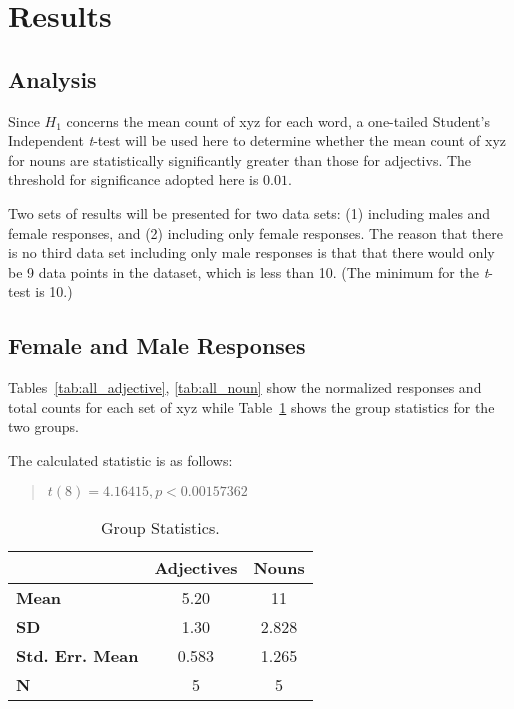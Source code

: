 \section {Results}
\label{results}
\subsection {Analysis} 
Since $H_{1}$ concerns the mean count of xyz for each word, a one-tailed Student's Independent \textit{t}-test will be used here to determine whether the mean count of xyz for nouns are statistically significantly greater than those for adjectivs.  The threshold for significance adopted here is $0.01$.  

Two sets of results will be presented for two data sets: (1) including males and female responses, and (2) including only female responses.  The reason that there is no third data set including only male responses is that that there would only be 9 data points in the dataset, which is less than 10.  (The minimum for the \textit{t}-test is 10.)

\subsection{Female and Male Responses}
Tables~\ref{tab:all_adjective}, \ref{tab:all_noun} show the normalized responses and total counts for each set of xyz while Table~\ref{tab:all_group_stats} shows the group statistics for the two groups.


%

The calculated statistic is as follows:
	\begin{quote}
		$t(8)=4.16415, p < 0.00157362$
	\end{quote}

\begin{table}
	\begin{center}
		\begin{tabular}{|l|c|c|} \hline
									& \textbf{Adjectives} 	& \textbf{Nouns}  \\ \hline \hline
			\textbf{Mean} 			& 5.20					& 11	\\
			\textbf{SD} 			& 1.30					& 2.828	\\
			\textbf{Std. Err. Mean} & 0.583					& 1.265	\\
			\textbf{N} 				& 5						& 5		\\
			\hline
		\end{tabular}
	\end{center}
	\caption {Group Statistics.}
	\label{tab:all_group_stats}
\end{table}


